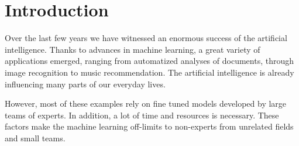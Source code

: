 \chapter*{Introduction}

Over the last few years we have witnessed an enormous success of the artificial
intelligence. Thanks to advances in machine learning, a great variety of
applications emerged, ranging from automatized analyses of documents, through
image recognition to music recommendation. The artificial intelligence is already
influencing many parts of our everyday lives.

However, most of these examples rely on fine tuned models developed by large
teams of experts. In addition, a lot of time and resources is necessary. These
factors make the machine learning off-limits to non-experts from unrelated fields
and small teams.